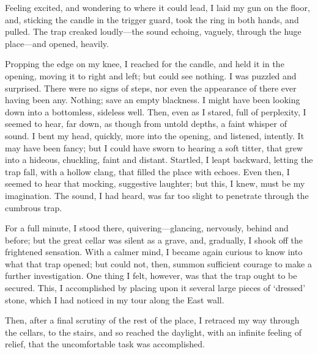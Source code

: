Feeling excited, and wondering to where it could lead, I laid my gun on the floor, and, sticking the candle in the trigger guard, took the ring in both hands, and pulled. The trap creaked loudly---the sound echoing, vaguely, through the huge place---and opened, heavily.

Propping the edge on my knee, I reached for the candle, and held it in the opening, moving it to right and left; but could see nothing. I was puzzled and surprised. There were no signs of steps, nor even the appearance of there ever having been any. Nothing; save an empty blackness. I might have been looking down into a bottomless, sideless well. Then, even as I stared, full of perplexity, I seemed to hear, far down, as though from untold depths, a faint whisper of sound. I bent my head, quickly, more into the opening, and listened, intently. It may have been fancy; but I could have sworn to hearing a soft titter, that grew into a hideous, chuckling, faint and distant. Startled, I leapt backward, letting the trap fall, with a hollow clang, that filled the place with echoes. Even then, I seemed to hear that mocking, suggestive laughter; but this, I knew, must be my imagination. The sound, I had heard, was far too slight to penetrate through the cumbrous trap.

For a full minute, I stood there, quivering---glancing, nervously, behind and before; but the great cellar was silent as a grave, and, gradually, I shook off the frightened sensation. With a calmer mind, I became again curious to know into what that trap opened; but could not, then, summon sufficient courage to make a further investigation. One thing I felt, however, was that the trap ought to be secured. This, I accomplished by placing upon it several large pieces of ‘dressed’ stone, which I had noticed in my tour along the East wall.

Then, after a final scrutiny of the rest of the place, I retraced my way through the cellars, to the stairs, and so reached the daylight, with an infinite feeling of relief, that the uncomfortable task was accomplished.

\clearpage
